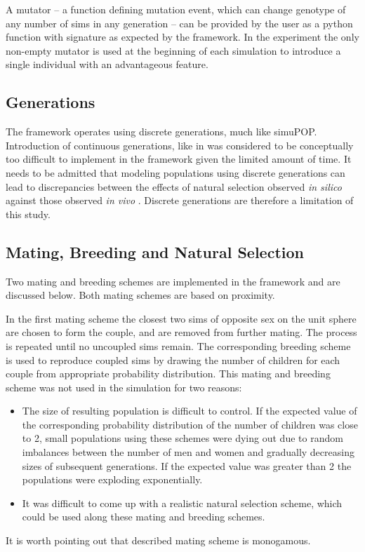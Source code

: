 \documentclass{l4proj}
\begin{document}
A mutator -- a function defining mutation event, which can change genotype of any number of sims in any generation -- can be provided by the user as a python function with signature as expected by the framework. In the experiment the only non-empty mutator is used at the beginning of each simulation to introduce a single individual with an advantageous feature.

\subsection{Generations}

The framework operates using discrete generations, much like simuPOP. Introduction of continuous generations, like in \parencite{rohde04} was considered to be conceptually too difficult to implement in the framework given the limited amount of time. It needs to be admitted that modeling populations using discrete generations can lead to discrepancies between the effects of natural selection observed \textit{in silico} against those observed \textit{in vivo} \parencite{Waples14}. Discrete generations are therefore a limitation of this study. 

\subsection{Mating, Breeding and Natural Selection}

Two mating and breeding schemes are implemented in the framework and are discussed below. Both mating schemes are based on proximity.

In the first mating scheme the closest two sims of opposite sex on the unit sphere are chosen to form the couple, and are removed from further mating. The process is repeated until no uncoupled sims remain. The corresponding breeding scheme is used to reproduce coupled sims by drawing the number of children for each couple from appropriate probability distribution. This mating and breeding scheme was not used in the simulation for two reasons:
\begin{itemize}
\item The size of resulting population is difficult to control. If the expected value of the corresponding probability distribution of the number of children was close to 2, small populations using these schemes were dying out due to random imbalances between the number of men and women and gradually decreasing sizes of subsequent generations. If the expected value was greater than 2 the populations were exploding exponentially.
\item It was difficult to come up with a realistic natural selection scheme, which could be used along these mating and breeding schemes.
\end{itemize}
It is worth pointing out that described mating scheme is monogamous.
\end{document}
